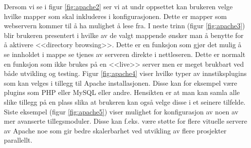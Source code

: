 Dersom vi se i figur \ref{fig:apache2} ser vi at undr oppsettet kan brukeren velge hvilke mapper som skal inkluderes i konfigurasjonen. Dette er mapper som webservern kommer til å ha mulighet å lese fra. 
I neste trinn (figur \ref{fig:apache3}) blir brukeren presentert i hvilke av de valgt mappende ønsker man å benytte for å aktivere <<directory browsing>>. Dette er en funksjon som gjør det mulig å se innholdet i mappe se tjenes av serveren direkte i nettleseren. Dette er normalt en funksjon som ikke brukes på en <<live>> server men er meget brukbart ved både utvikling og testing. 
Figur \ref{fig:apache4} viser hvilke typer av innstiksplugins som kan velges i tillegg til Apache installasjonen. Disse kan for eksempel være plugins som PHP eller MySQL eller andre. Hensikten er at man kan samla alle slike tillegg på en plass slika at brukeren kan også velge disse i et seinere tilfelde.
Siste eksempel (figur \ref{fig:apache5}) viser mulighet for konfigurasjon av noen av mer avanserte tillegsmoduler. Disse kan f.eks. være støtte for flere vituelle servere av Apache noe som gir bedre skalerbarhet ved utvikling av flere prosjekter parallellt. 
